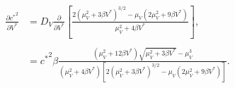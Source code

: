 \documentclass{jpmarticle}
\begin{document}
\begin{equation}
  \begin{split}
    \frac{\partial {c^*}^2}{\partial V^*}
    &=
    D_V
    \frac{\partial}{\partial V^*} \left[
      \frac{2 \left(\mu_V^2 + 3 \beta V^*\right)^{3/2}
        - \mu_V \left(2 \mu_V^2 + 9 \beta V^*\right)}
      {\mu_V^2 + 4 \beta V^*}
    \right],
    \\
    \\
    &=
    {c^*}^2 \beta
    \frac{\left(\mu_V^2 + 12 \beta V^*\right)
      \sqrt{\mu_V^2 + 3 \beta V^*} - \mu_V^3}
    {\left(\mu_V^2 + 4 \beta V^*\right)
      \left[2 \left(\mu_V^2 + 3 \beta V^*\right)^{3/2}
        - \mu_V \left(2 \mu_V^2 + 9 \beta V^*\right)\right]}.
  \end{split}
\end{equation}
\end{document}
